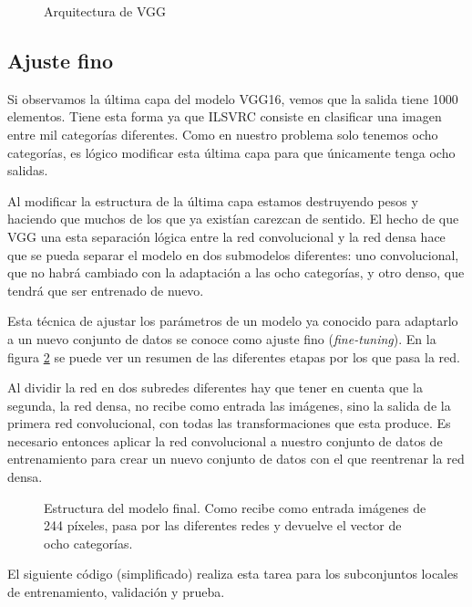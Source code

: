 \begin{figure}
  \caption{Arquitectura de VGG}
\label{vgg16-arch}
\end{figure}

\subsection{Ajuste fino}

Si observamos la última capa del modelo VGG16, vemos que la salida tiene 1000
elementos. Tiene esta forma ya que ILSVRC consiste en clasificar una imagen
entre mil categorías diferentes. Como en nuestro problema solo tenemos ocho
categorías, es lógico modificar esta última capa para que únicamente tenga ocho
salidas.

Al modificar la estructura de la última capa estamos destruyendo pesos y
haciendo que muchos de los que ya existían carezcan de sentido. El hecho de que
VGG una esta separación lógica entre la red convolucional y la red densa hace
que se pueda separar el modelo en dos submodelos diferentes: uno convolucional,
que no habrá cambiado con la adaptación a las ocho categorías, y otro denso,
que tendrá que ser entrenado de nuevo.

Esta técnica de ajustar los parámetros de un modelo ya conocido para adaptarlo
a un nuevo conjunto de datos se conoce como ajuste fino (\textit{fine-tuning}).
En la figura \ref{basic_architecture} se puede ver un resumen de las diferentes
etapas por los que pasa la red.

Al dividir la red en dos subredes diferentes hay que tener en cuenta que la
segunda, la red densa, no recibe como entrada las imágenes, sino la salida de
la primera red convolucional, con todas las transformaciones que esta produce.
Es necesario entonces aplicar la red convolucional a nuestro conjunto de datos
de entrenamiento para crear un nuevo conjunto de datos con el que reentrenar la
red densa.

\begin{figure}
  \caption{Estructura del modelo final. Como recibe como entrada imágenes de 244 píxeles, pasa por las diferentes redes y devuelve el vector de ocho categorías.}
\label{basic_architecture}
\end{figure}

El siguiente código (simplificado) realiza esta tarea para los subconjuntos
locales de entrenamiento, validación y prueba.

